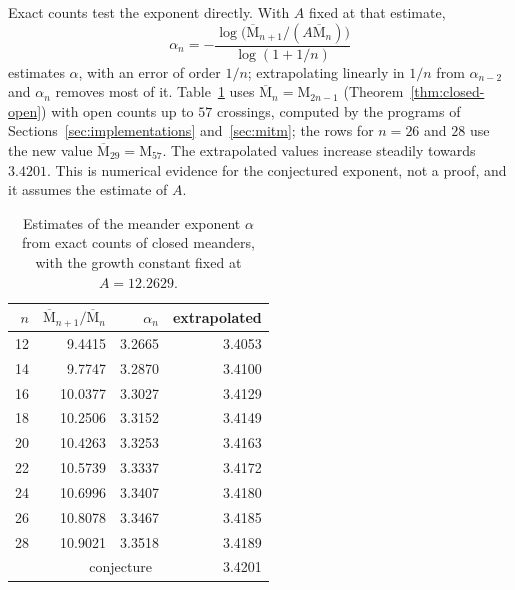 \documentclass[11pt]{amsart}
\theoremstyle{definition}
\theoremstyle{remark}
\newcommand{\Open}{\mathrm{M}}
\newcommand{\Closed}{\overline{\mathrm{M}}}
\begin{document}
Exact counts test the exponent directly. With $A$ fixed at that estimate,
\[ \alpha_n = -\frac{\log\bigl(\Closed_{n+1}/(A \Closed_n)\bigr)}{\log(1 + 1/n)} \]
estimates $\alpha$, with an error of order $1/n$; extrapolating linearly in $1/n$ from $\alpha_{n-2}$ and $\alpha_n$ removes most
of it. Table~\ref{tab:exponent} uses $\Closed_n = \Open_{2n-1}$
(Theorem~\ref{thm:closed-open}) with open counts up to $57$ crossings, computed by the
programs of Sections~\ref{sec:implementations} and~\ref{sec:mitm}; the rows for $n = 26$ and
$28$ use the new value $\Closed_{29} = \Open_{57}$. The
extrapolated values increase steadily towards $3.4201$. This is numerical evidence for the
conjectured exponent, not a proof, and it assumes the estimate of $A$.

\begin{table}[t]
\centering
\begin{tabular}{rrrr}
\toprule
$n$ & $\Closed_{n+1}/\Closed_n$ & $\alpha_n$ & extrapolated \\
\midrule
12 & 9.4415 & 3.2665 & 3.4053 \\
14 & 9.7747 & 3.2870 & 3.4100 \\
16 & 10.0377 & 3.3027 & 3.4129 \\
18 & 10.2506 & 3.3152 & 3.4149 \\
20 & 10.4263 & 3.3253 & 3.4163 \\
22 & 10.5739 & 3.3337 & 3.4172 \\
24 & 10.6996 & 3.3407 & 3.4180 \\
26 & 10.8078 & 3.3467 & 3.4185 \\
28 & 10.9021 & 3.3518 & 3.4189 \\
\midrule
\multicolumn{3}{r}{conjecture~\cite{dgg00}} & 3.4201 \\
\bottomrule
\end{tabular}
\caption{Estimates of the meander exponent $\alpha$ from exact counts of closed meanders, with
the growth constant fixed at $A = 12.2629$.}
\label{tab:exponent}
\end{table}
\end{document}
